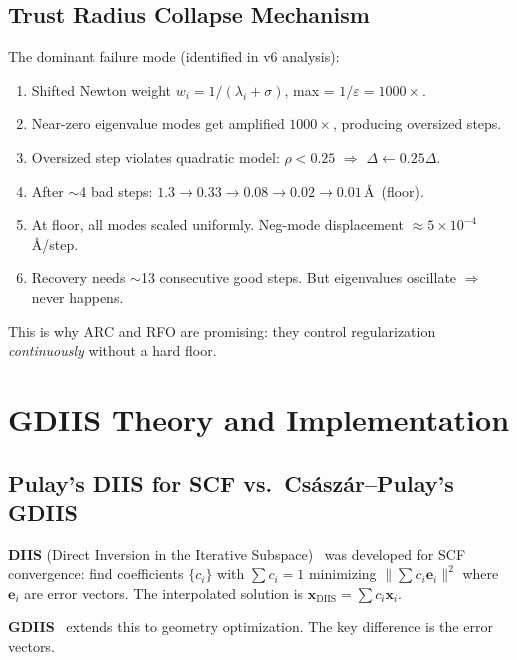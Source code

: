 \documentclass[11pt,a4paper]{article}
\newcommand{\vect}[1]{\bm{#1}}
\newcommand{\norm}[1]{\lVert #1 \rVert}
\theoremstyle{definition}
\begin{document}
\subsection{Trust Radius Collapse Mechanism}
\label{sec:collapse}

The dominant failure mode (identified in v6 analysis):
\begin{enumerate}[nosep]
  \item Shifted Newton weight $w_i = 1/(\lambda_i+\sigma)$, max = $1/\varepsilon = 1000\times$.
  \item Near-zero eigenvalue modes get amplified $1000\times$, producing oversized steps.
  \item Oversized step violates quadratic model: $\rho < 0.25$ $\Rightarrow$ $\Delta \gets 0.25\Delta$.
  \item After $\sim$4 bad steps: $1.3 \to 0.33 \to 0.08 \to 0.02 \to 0.01$\,\AA\ (floor).
  \item At floor, all modes scaled uniformly. Neg-mode displacement $\approx 5\times10^{-4}$\,\AA/step.
  \item Recovery needs $\sim$13 consecutive good steps. But eigenvalues oscillate $\Rightarrow$ never happens.
\end{enumerate}

This is why ARC and RFO are promising: they control regularization
\emph{continuously} without a hard floor.

\section{GDIIS Theory and Implementation}
\label{sec:gdiis}

\subsection{Pulay's DIIS for SCF vs.\ Cs\'asz\'ar--Pulay's GDIIS}

\textbf{DIIS} (Direct Inversion in the Iterative Subspace)~\citep{pulay-diis}
was developed for SCF convergence: find coefficients $\{c_i\}$ with
$\sum c_i = 1$ minimizing $\norm{\sum c_i \vect{e}_i}^2$ where $\vect{e}_i$
are error vectors.  The interpolated solution is $\vect{x}_\text{DIIS} =
\sum c_i \vect{x}_i$.

\textbf{GDIIS}~\citep{gdiis-csaszar-pulay} extends this to geometry
optimization.  The key difference is the error vectors.
\end{document}
